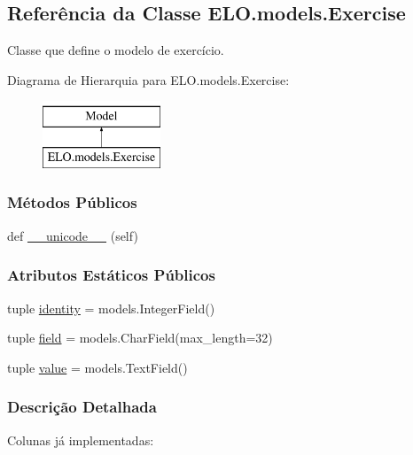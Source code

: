 \hypertarget{classELO_1_1models_1_1Exercise}{}\subsection{Referência da Classe E\+L\+O.\+models.\+Exercise}
\label{classELO_1_1models_1_1Exercise}


Classe que define o modelo de exercício.  


Diagrama de Hierarquia para E\+L\+O.\+models.\+Exercise\+:\begin{figure}[H]
\begin{center}
\leavevmode
\includegraphics[height=2.000000cm]{d3/da8/classELO_1_1models_1_1Exercise}
\end{center}
\end{figure}
\subsubsection*{Métodos Públicos}
\begin{DoxyCompactItemize}
\item 
def \hyperlink{classELO_1_1models_1_1Exercise_a23f81c66e4d6bc5a4582d74d191f5117}{\+\_\+\+\_\+unicode\+\_\+\+\_\+} (self)
\end{DoxyCompactItemize}
\subsubsection*{Atributos Estáticos Públicos}
\begin{DoxyCompactItemize}
\item 
tuple \hyperlink{classELO_1_1models_1_1Exercise_a0b63268e129a279de260ad21060a1b55}{identity} = models.\+Integer\+Field()
\item 
tuple \hyperlink{classELO_1_1models_1_1Exercise_a4567f8aa62747a0eabb1c89ab18ec1ce}{field} = models.\+Char\+Field(max\+\_\+length=32)
\item 
tuple \hyperlink{classELO_1_1models_1_1Exercise_ae4d0d7ecfe0004385c031cbba76f3b4d}{value} = models.\+Text\+Field()
\end{DoxyCompactItemize}


\subsubsection{Descrição Detalhada}
Colunas já implementadas\+:

